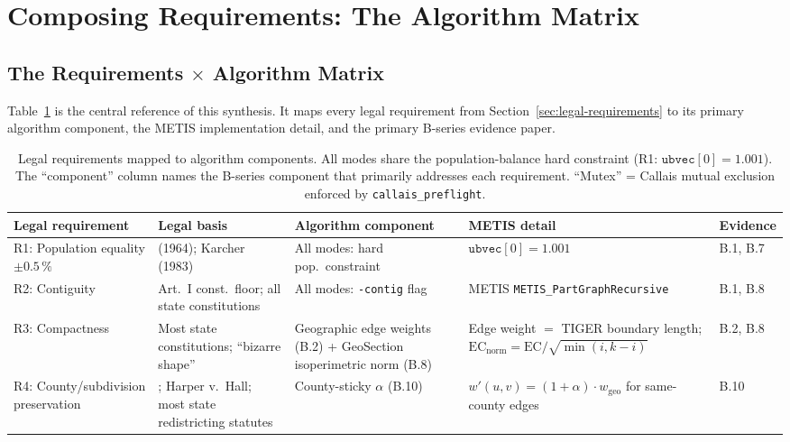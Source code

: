 \section{Composing Requirements: The Algorithm Matrix}
\label{sec:requirements-matrix}

\subsection{The Requirements $\times$ Algorithm Matrix}

Table~\ref{tab:requirements-matrix} is the central reference of this synthesis.
It maps every legal requirement from Section~\ref{sec:legal-requirements} to its
primary algorithm component, the METIS implementation detail, and the primary
B-series evidence paper.

\begin{landscape}
\begin{table}[p]
\centering
\small
\caption{Legal requirements mapped to algorithm components.
  All modes share the population-balance hard constraint (R1: $\mathtt{ubvec}[0]=1.001$).
  The ``component'' column names the B-series component that primarily addresses each requirement.
  ``Mutex'' = Callais mutual exclusion enforced by \texttt{callais\_preflight}.}
\label{tab:requirements-matrix}
\begin{tabular}{p{3.5cm}p{2.5cm}p{3.5cm}p{2.0cm}p{1.5cm}}
\toprule
\textbf{Legal requirement} & \textbf{Legal basis} & \textbf{Algorithm component} & \textbf{METIS detail} & \textbf{Evidence} \\
\midrule
R1: Population equality $\pm 0.5\,\%$ & \wesberry{} (1964); Karcher (1983) & All modes: hard pop.\ constraint & $\mathtt{ubvec}[0]=1.001$ & B.1, B.7 \\[0.5em]

R2: Contiguity & Art.~I const.\ floor; all state constitutions & All modes: \texttt{-contig} flag & METIS \texttt{METIS\_PartGraphRecursive} & B.1, B.8 \\[0.5em]

R3: Compactness & Most state constitutions; \shaw{} ``bizarre shape'' & Geographic edge weights (B.2) + GeoSection isoperimetric norm (B.8) & Edge weight $= $ TIGER boundary length; $\mathrm{EC}_\text{norm} = \mathrm{EC}/\sqrt{\min(i,k-i)}$ & B.2, B.8 \\[0.5em]

R4: County/subdivision preservation & \rucho{}; Harper v.\ Hall; most state redistricting statutes & County-sticky $\alpha$ (B.10) & $w'(u,v)=(1+\alpha)\cdot w_\text{geo}$ for same-county edges & B.10 \\[0.5em]


\end{tabular}
\end{table}
\end{landscape}
